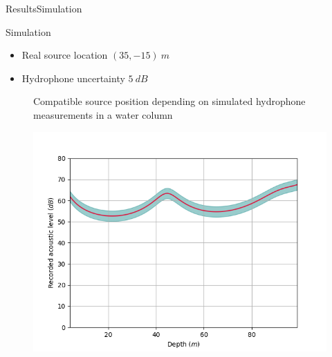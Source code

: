 \documentclass[9pt, xcolor={usenames, dvipsnames}]{beamer}
\begin{document}
				\begin{frame}{Results}{Simulation}
					\centering
					\begin{minipage}{0.6\textwidth}
						\begin{exampleblock}{Simulation}
							\begin{itemize}
								\item Real source location $(35, -15)\ m$
								\item Hydrophone uncertainty $5\ dB$
							\end{itemize}
						\end{exampleblock}
					\end{minipage}
					\begin{minipage}[c]{0.48\textwidth}
						\begin{figure}
							\caption{Compatible source position depending on simulated hydrophone measurements in a water column}
						\end{figure}
					\end{minipage}
					\hfill
					\begin{minipage}[c]{0.48\textwidth}
						\begin{overprint}
								\begin{figure}
									\includegraphics[width=\textwidth]{images/recorded_level.png}

\end{figure}
\end{overprint}
\end{minipage}
\end{frame}
\end{document}
